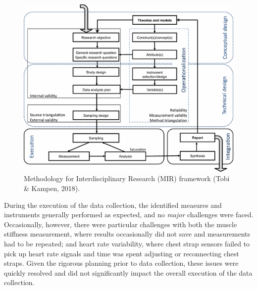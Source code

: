 \documentclass[man,floatsintext]{apa6}
\begin{document}
\begin{figure}

{\centering \includegraphics[width=1\linewidth]{figs/discussion/MIR_framework} 

}

\caption{Methodology for Interdisciplinary Research (MIR) framework (Tobi \& Kampen, 2018).}\label{fig:mir-framework}
\end{figure}

During the execution of the data collection, the identified measures and instruments generally performed as expected, and no \emph{major} challenges were faced.
Occasionally, however, there were particular challenges with both the muscle stiffness measurement, where results occasionally did not save and measurements had to be repeated; and heart rate variability, where chest strap sensors failed to pick up heart rate signals and time was spent adjusting or reconnecting chest straps.
Given the rigorous planning prior to data collection, these issues were quickly resolved and did not significantly impact the overall execution of the data collection.
\end{document}
